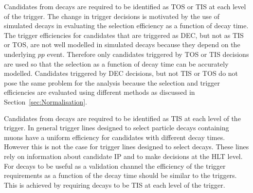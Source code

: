 Candidates from \bsmumu decays are required to be identified as TOS or TIS at each level of the trigger. The change in trigger decisions is motivated by the use of simulated decays in evaluating the selection efficiency as a function of decay time.
The trigger efficiencies for candidates that are triggered as DEC, but not as TIS or TOS, are not well modelled in simulated decays because they depend on the underlying $pp$ event. Therefore only candidates triggered by TOS or TIS decisions are used so that the selection as a function of decay time can be accurately modelled. %
Candidates triggered by DEC decisions, but not TIS or TOS do not pose the same problem for the \BF analysis because the selection and trigger efficiencies are evaluated using different methods as discussed in Section~\ref{sec:Normalisation}.

Candidates from \bhh decays are required to be identified as TIS at each level of the trigger. In general trigger lines designed to select particle decays containing muons have a uniform efficiency for candidates with different decay times. However this is not the case for trigger lines designed to select \bhh decays. These lines rely on information about candidate IP and \chiIP to make decisions at the HLT level. For \bhh decays to be useful as a validation channel the efficiency of the trigger requirements as a function of the decay time should be similar to the \bsmumu triggers. This is achieved by requiring decays to be TIS at each level of the trigger.

